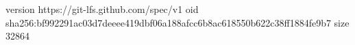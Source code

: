 version https://git-lfs.github.com/spec/v1
oid sha256:bf992291ac03d7deeee419dbf06a188afcc6b8ac618550b622c38ff1884fe9b7
size 32864
